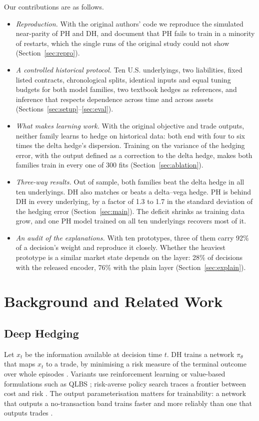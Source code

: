 \documentclass[10pt,conference]{IEEEtran}
\begin{document}
Our contributions are as follows.
\begin{itemize}
\item \emph{Reproduction.} With the original authors' code we reproduce the
simulated near-parity of PH and DH, and document that PH fails to train in a
minority of restarts, which the single runs of the original study could not
show (Section~\ref{sec:repro}).
\item \emph{A controlled historical protocol.} Ten U.S. underlyings, two
liabilities, fixed listed contracts, chronological splits, identical inputs
and equal tuning budgets for both model families, two textbook hedges as
references, and inference that respects dependence across time and across
assets (Sections~\ref{sec:setup}--\ref{sec:eval}).
\item \emph{What makes learning work.} With the original objective and trade
outputs, neither family learns to hedge on historical data: both end with
four to six times the delta hedge's dispersion. Training on the variance of
the hedging error, with the output defined as a correction to the delta
hedge, makes both families train in every one of 300 fits
(Section~\ref{sec:ablation}).
\item \emph{Three-way results.} Out of sample, both families beat the delta
hedge in all ten underlyings. DH also matches or beats a delta--vega hedge.
PH is behind DH in every underlying, by a factor of 1.3 to 1.7 in the
standard deviation of the hedging error (Section~\ref{sec:main}). The deficit
shrinks as training data grow, and one PH model trained on all ten
underlyings recovers most of it.
\item \emph{An audit of the explanations.} With ten prototypes, three of them
carry 92\% of a decision's weight and reproduce it closely. Whether the
heaviest prototype is a similar market state depends on the layer: 28\% of
decisions with the released encoder, 76\% with the plain layer
(Section~\ref{sec:explain}).
\end{itemize}

\section{Background and Related Work}

\subsection{Deep Hedging}
Let $x_t$ be the information available at decision time $t$. DH trains a
network $\pi_\theta$ that maps $x_t$ to a trade, by minimising a risk measure
of the terminal outcome over whole episodes \cite{buehler2019deep}. Variants
use reinforcement learning \cite{kolm2019dynamic,cao2021deep} or value-based
formulations such as QLBS \cite{halperin2020qlbs}; risk-averse policy search
traces a frontier between cost and risk \cite{vittori2020option}. The output
parameterisation matters for trainability: a network that outputs a
no-transaction band trains faster and more reliably than one that outputs
trades \cite{imaki2021notransaction}.
\end{document}

